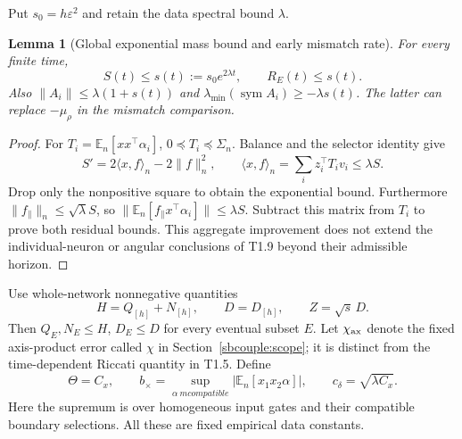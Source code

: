 \documentclass{article} %
\theoremstyle{plain}
\newtheorem{lemma}[theorem]{Lemma}
\theoremstyle{definition}
\theoremstyle{remark}
\begin{document}
Put $s_0=h\varepsilon^2$ and retain the data spectral bound $\lambda$.
\begin{lemma}[Global exponential mass bound and early mismatch rate]
\label{sbwindow:mass}
For every finite time,
\[
 S(t)\le s(t):=s_0e^{2\lambda t},\qquad R_E(t)\le s(t).
\]
Also $\|A_i\|\le\lambda(1+s(t))$ and
$\lambda_{\min}(\operatorname{sym}A_i)\ge-\lambda s(t)$.
The latter can replace $-\mu_\rho$ in the mismatch comparison.
\end{lemma}
\begin{proof}
For $T_i=\mathbb E_n[xx^\top\alpha_i]$, $0\preceq T_i\preceq\Sigma_n$.
Balance and the selector identity give
\[
 S'=2\langle x,f\rangle_n-2\|f\|_n^2,
 \qquad \langle x,f\rangle_n=\sum_i z_i^\top T_i v_i\le\lambda S.
\]
Drop only the nonpositive square to obtain the exponential bound.
Furthermore $\|f_\parallel\|_n\le\sqrt\lambda S$, so
$\|\mathbb E_n[f_\parallel x^\top\alpha_i]\|\le\lambda S$.
Subtract this matrix from $T_i$ to prove both residual bounds. This
aggregate improvement does not extend the individual-neuron or angular
conclusions of T1.9 beyond their admissible horizon.
\end{proof}

Use whole-network nonnegative quantities
\[
 H=Q_{[h]}+N_{[h]},\qquad D=D_{[h]},\qquad Z=\sqrt{s}\,D.
\]
Then $Q_E,N_E\le H$, $D_E\le D$ for every eventual subset $E$.
Let $\chi_{\rm ax}$ denote the fixed axis-product error called $\chi$ in
Section~\ref{sbcouple:scope}; it is distinct from the time-dependent
Riccati quantity in T1.5. Define
\[
 \Theta=C_x,\qquad b_\times=\sup_{\alpha\ {
m compatible}}
       |\mathbb E_n[x_1x_2\alpha]|,
 \qquad c_\delta=\sqrt{\lambda C_x}.
\]
Here the supremum is over homogeneous input gates and their compatible
boundary selections. All these are fixed empirical data constants.
\end{document}
